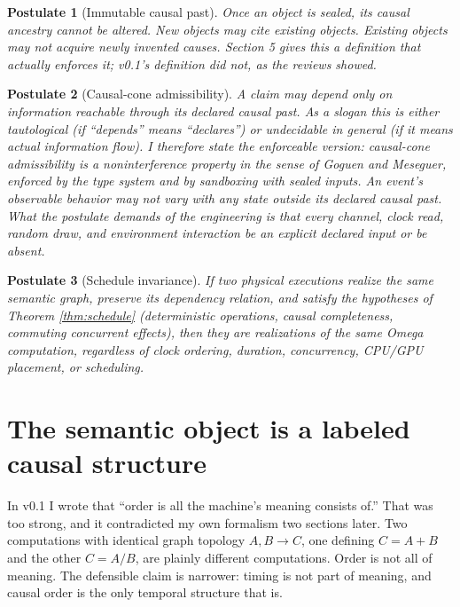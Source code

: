\documentclass[11pt]{article}
\newtheorem{postulate}{Postulate}
\begin{document}
\begin{postulate}[Immutable causal past]
Once an object is sealed, its causal ancestry cannot be altered. New objects may cite existing objects. Existing objects may not acquire newly invented causes. Section 5 gives this a definition that actually enforces it; v0.1's definition did not, as the reviews showed.
\end{postulate}

\begin{postulate}[Causal-cone admissibility]
A claim may depend only on information reachable through its declared causal past. As a slogan this is either tautological (if ``depends'' means ``declares'') or undecidable in general (if it means actual information flow). I therefore state the enforceable version: causal-cone admissibility is a noninterference property in the sense of Goguen and Meseguer, enforced by the type system and by sandboxing with sealed inputs. An event's observable behavior may not vary with any state outside its declared causal past. What the postulate demands of the engineering is that every channel, clock read, random draw, and environment interaction be an explicit declared input or be absent.
\end{postulate}

\begin{postulate}[Schedule invariance]
If two physical executions realize the same semantic graph, preserve its dependency relation, and satisfy the hypotheses of Theorem \ref{thm:schedule} (deterministic operations, causal completeness, commuting concurrent effects), then they are realizations of the same Omega computation, regardless of clock ordering, duration, concurrency, CPU/GPU placement, or scheduling.
\end{postulate}

\section{The semantic object is a labeled causal structure}

In v0.1 I wrote that ``order is all the machine's meaning consists of.'' That was too strong, and it contradicted my own formalism two sections later. Two computations with identical graph topology $A, B \to C$, one defining $C = A+B$ and the other $C = A/B$, are plainly different computations. Order is not all of meaning. The defensible claim is narrower: timing is not part of meaning, and causal order is the only temporal structure that is.
\end{document}
